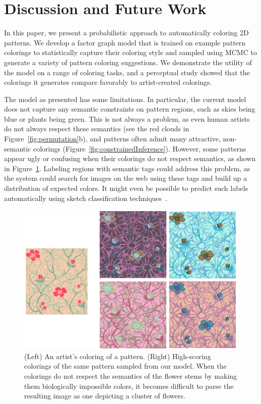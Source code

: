 \section{Discussion and Future Work}
\label{sec:discussion}

In this paper, we present a probabilistic approach to automatically coloring 2D patterns. We develop a factor graph model that is trained on example pattern colorings to statistically capture their coloring style and sampled using MCMC to generate a variety of pattern coloring suggestions. We demonstrate the utility of the model on a range of coloring tasks, and a perceptual study showed that the colorings it generates compare favorably to artist-created colorings.

The model as presented has some limitations. In particular, the current model does not capture any semantic constraints on pattern regions, such as skies being blue or plants being green. This is not always a problem, as even human artists do not always respect these semantics (see the red clouds in Figure~\ref{fig:permutation}b), and patterns often admit many attractive, non-semantic colorings (Figure~\ref{fig:constrainedInference}). However, some patterns appear ugly or confusing when their colorings do not respect semantics, as shown in Figure~\ref{fig:badFlowers}. Labeling regions with semantic tags could address this problem, as the system could search for images on the web using these tags and build up a distribution of expected colors. It might even be possible to predict such labels automatically using sketch classification techniques~\cite{SketchClassification}.~ 

\begin{figure}
\centering
\includegraphics[width=0.7\columnwidth]{figs/badFlowers}
\caption{(Left) An artist's coloring of a pattern. (Right) High-scoring colorings of the same pattern sampled from our model. When the colorings do not respect the semantics of the flower stems by making them biologically impossible colors, it becomes difficult to parse the resulting image as one depicting a cluster of flowers.}
\label{fig:badFlowers}
\end{figure}

